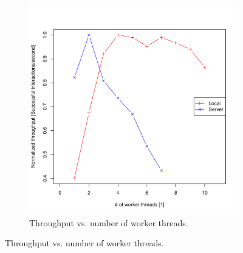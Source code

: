 \documentclass[12pt]{article}
\begin{document}
\begin{figure}[htbp]
\begin{subfigure}[t]{0.5\textwidth}
\includegraphics[scale=0.4]{throughput.pdf}
\caption{Throughput vs. number of worker threads.}
\end{subfigure}
\end{figure}
\end{document}
